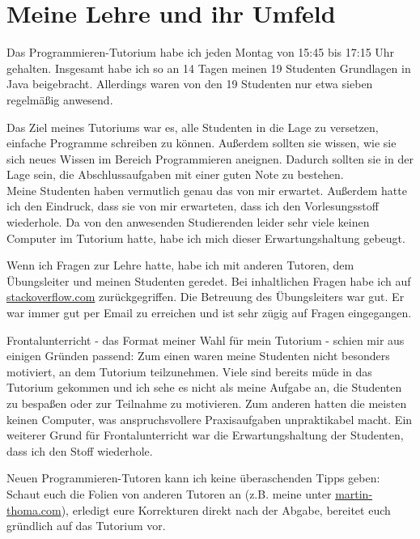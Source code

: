 \documentclass[a4paper,12pt]{article}
\newcommand{\Jahr}{2012 / 2013}         %
\newcommand{\Semester}{Wintersemester}  %
\newcommand{\Datum}{\today}             %
\newcommand{\Vorname}{Martin}
\newcommand{\Nachname}{Thoma}
\begin{document}
 
 \setcounter{page}{2}


\section*{Meine Lehre und ihr Umfeld}
Das Programmieren-Tutorium habe ich jeden Montag von 15:45 bis 17:15 
Uhr gehalten. Insgesamt habe ich so an 14 Tagen meinen 19 Studenten 
Grundlagen in Java beigebracht. Allerdings waren von den 19 Studenten
nur etwa sieben regelmäßig anwesend.

Das Ziel meines Tutoriums war es, alle Studenten in die Lage zu 
versetzen, einfache Programme schreiben zu können. Außerdem sollten 
sie wissen, wie sie sich neues Wissen im Bereich Programmieren 
aneignen. Dadurch sollten sie in der Lage sein, die Abschlussaufgaben
mit einer guten Note zu bestehen.\\
Meine Studenten haben vermutlich genau das von mir erwartet. Außerdem
hatte ich den Eindruck, dass sie von mir erwarteten, dass ich den 
Vorlesungsstoff wiederhole. Da von den anwesenden Studierenden leider
sehr viele keinen Computer im Tutorium hatte, habe ich mich dieser
Erwartungshaltung gebeugt. 

Wenn ich Fragen zur Lehre hatte, habe ich mit anderen Tutoren, dem
Übungsleiter und meinen Studenten geredet. Bei inhaltlichen Fragen 
habe ich auf \href{http://stackoverflow.com/}{stackoverflow.com}
zurückgegriffen.
Die Betreuung des Übungsleiters war gut. Er war immer gut per Email
zu erreichen und ist sehr zügig auf Fragen eingegangen. 

Frontalunterricht - das Format meiner Wahl für mein Tutorium - schien
mir aus einigen Gründen passend: Zum einen waren meine Studenten 
nicht besonders motiviert, an dem Tutorium teilzunehmen. Viele sind
bereits müde in das Tutorium gekommen und ich sehe es nicht als meine
Aufgabe an, die Studenten zu bespaßen oder zur Teilnahme zu 
motivieren. Zum anderen hatten die meisten keinen Computer, was 
anspruchsvollere Praxisaufgaben unpraktikabel macht. Ein weiterer 
Grund für Frontalunterricht war die Erwartungshaltung der Studenten, 
dass ich den Stoff wiederhole.

Neuen Programmieren-Tutoren kann ich keine überaschenden Tipps geben:
Schaut euch die Folien von anderen Tutoren an (z.B. meine unter
\href{martin-thoma.com/programmieren-tutorium}{martin-thoma.com}),
erledigt eure Korrekturen direkt nach der Abgabe, bereitet euch gründlich 
auf das Tutorium vor.
\end{document}
